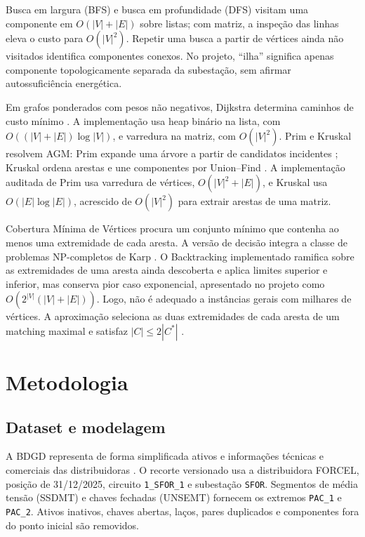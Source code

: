\documentclass[12pt]{article}
\begin{document}
Busca em largura (BFS) e busca em profundidade (DFS) visitam uma componente em $O(|V|+|E|)$ sobre listas; com matriz, a inspeção das linhas eleva o custo para $O(|V|^2)$. Repetir uma busca a partir de vértices ainda não visitados identifica componentes conexos. No projeto, ``ilha'' significa apenas componente topologicamente separada da subestação, sem afirmar autossuficiência energética.

Em grafos ponderados com pesos não negativos, Dijkstra determina caminhos de custo mínimo \cite{dijkstra1959}. A implementação usa heap binário na lista, com $O((|V|+|E|)\log |V|)$, e varredura na matriz, com $O(|V|^2)$. Prim e Kruskal resolvem AGM: Prim expande uma árvore a partir de candidatos incidentes \cite{prim1957}; Kruskal ordena arestas e une componentes por Union--Find \cite{kruskal1956}. A implementação auditada de Prim usa varredura de vértices, $O(|V|^2+|E|)$, e Kruskal usa $O(|E|\log |E|)$, acrescido de $O(|V|^2)$ para extrair arestas de uma matriz.

Cobertura Mínima de Vértices procura um conjunto mínimo que contenha ao menos uma extremidade de cada aresta. A versão de decisão integra a classe de problemas NP-completos de Karp \cite{karp1972}. O Backtracking implementado ramifica sobre as extremidades de uma aresta ainda descoberta e aplica limites superior e inferior, mas conserva pior caso exponencial, apresentado no projeto como $O(2^{|V|}(|V|+|E|))$. Logo, não é adequado a instâncias gerais com milhares de vértices. A aproximação seleciona as duas extremidades de cada aresta de um matching maximal e satisfaz $|C|\leq 2|C^*|$ \cite{vazirani2001}.

\section{Metodologia}

\subsection{Dataset e modelagem}

A BDGD representa de forma simplificada ativos e informações técnicas e comerciais das distribuidoras \cite{aneelbdgd}. O recorte versionado usa a distribuidora FORCEL, posição de 31/12/2025, circuito \texttt{1\_SFOR\_1} e subestação \texttt{SFOR}. Segmentos de média tensão (SSDMT) e chaves fechadas (UNSEMT) fornecem os extremos \texttt{PAC\_1} e \texttt{PAC\_2}. Ativos inativos, chaves abertas, laços, pares duplicados e componentes fora do ponto inicial são removidos.
\end{document}
